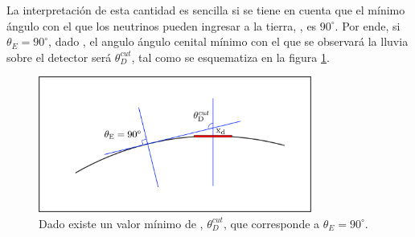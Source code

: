 	La interpretaci\'on de esta cantidad es sencilla si se tiene en cuenta que el m\'inimo \'angulo con el que los neutrinos pueden ingresar a la tierra, \te{}, es $90^\circ$. 
	Por ende, si $\theta_E=90^\circ$, dado \xd{}, el angulo \'angulo cenital m\'inimo con el que se observar\'a la lluvia sobre el detector ser\'a $\theta_D^{cut}$, tal como se esquematiza en la figura \ref{fig:curveEarthSketch_thCut}.
	\begin{figure}[ht!]
		\centering
		\includegraphics[width=0.8\textwidth]{./fig/appendix/curveEarthSketch_thCut.pdf}
		\caption{\label{fig:curveEarthSketch_thCut}
		Dado \xd{} existe un valor m\'inimo de \td{}, $\theta_D^{cut}$, que corresponde a $\theta_E=90^\circ$.
		}
	\end{figure}
	
